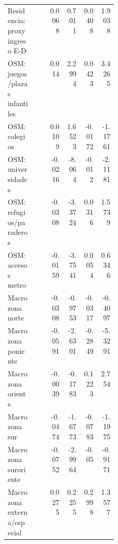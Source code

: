 \documentclass[11pt,letterpaper]{article}
\begin{document}
\begin{landscape}
\begin{longtable}{p{0.25\linewidth}rrrrrr}
Residencia: proxy ingreso E-D & & & 0.0068 & 0.7011 & 0.0408 & 1.9038 \\
OSM: juegos/plazas infantiles & & & 0.014 & 2.2994 & 0.0423 & 3.4265 \\
OSM: colegios & & & 0.0109 & 1.6523 & -0.0172 & -1.1761 \\
OSM: universidades & & & -0.0216 & -8.064 & -0.012 & -2.1181 \\
OSM: refugios/paraderos & & & -0.0308 & -3.3724 & 0.0316 & 1.5739 \\
OSM: accesos metro & & & -0.0159 & -3.7541 & 0.0054 & 0.6346 \\
Macrozona norte & & & -0.0308 & -0.9753 & -0.0317 & -0.4097 \\
Macrozona poniente & & & -0.0591 & -2.6301 & -0.2849 & -5.3291 \\
Macrozona oriente & & & -0.0039 & -0.1783 & 0.1223 & 2.754 \\
Macrozona sur & & & -0.0474 & -1.6773 & -0.0783 & -1.1975 \\
Macrozona suroriente & & & -0.0752 & -2.9964 & -0.05 & -0.9171 \\
Macrozona externa/especial & & & 0.0275 & 0.2255 & 0.2998 & 1.3577 \\
\end{longtable}
\end{landscape}
\end{document}
